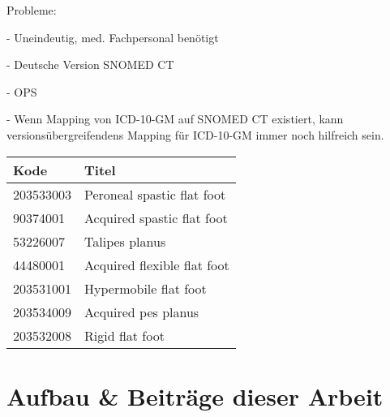 Probleme: 

- Uneindeutig, med. Fachpersonal benötigt

- Deutsche Version SNOMED CT

- OPS

- Wenn Mapping von ICD-10-GM auf SNOMED CT existiert, kann versionsübergreifendens Mapping für ICD-10-GM immer noch hilfreich sein. 



{
\renewcommand{\arraystretch}{1.2}
\begin{tabular}{ll}
Kode & Titel \\
\hline
203533003 & Peroneal spastic flat foot \\
90374001 & Acquired spastic flat foot \\
53226007 & Talipes planus \\
44480001 & Acquired flexible flat foot \\
203531001 & Hypermobile flat foot \\
203534009 & Acquired pes planus \\
203532008 & Rigid flat foot \\
\end{tabular}
}

\begin{comment}
M21.4
Flat foot [pes planus] (acquired)

Jaro-Winkler: Acquired pes planus 
Smith Waterman Gotoh: Talipes planus
\end{comment}




\section{Aufbau \& Beiträge dieser Arbeit}





